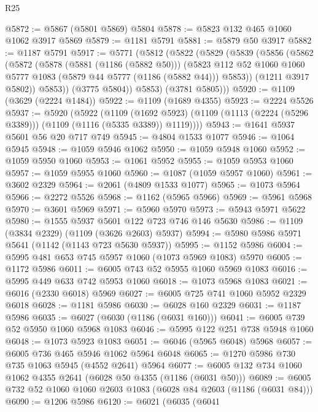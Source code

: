 \begin{lexlean}{R25}
\begin{coremodule}
@5872 := @5867 (@5801 @5869) @5804
@5878 := @5823 @132 @465 @1060 @1062 @3917 @5869
@5879 := @1181 @5791
@5881 := @5879 @50 @3917
@5882 := @1187 @5791
@5917 := @5771
    (@5812
      (@5822
        (@5829
          (@5839
            (@5856
              (@5862
                (@5872
                  (@5878
                    (@5881 (@1186 (@5882 @50)))
                    (@5823
                      @112
                      @52
                      @1060
                      @1060
                      @5777
                      @1083
                      (@5879 @44 @5777 (@1186 (@5882 @44)))
                      @5853))
                  (@1211 @3917 @5802))
                @5853))
            (@3775 @5804))
          @5853)
        (@3781 @5805)))
@5920 := @1109 (@3629 (@2224 @1484))
@5922 := @1109 (@1689 @4355)
@5923 := @2224 @5526
@5937 := @5920
    (@5922
      (@1109
        (@1692 @5923)
        (@1109 (@1113 (@2224 (@5296 @3389))) (@1109 (@1116 (@5335 @3389)) @1119))))
@5943 := @1641 @5937 @5601 @56 @20 @717 @749
@5945 := @4804 @1533 @1077
@5946 := @1064 @5945
@5948 := @1059 @5946 @1062
@5950 := @1059 @5948 @1060
@5952 := @1059 @5950 @1060
@5953 := @1061 @5952
@5955 := @1059 @5953 @1060
@5957 := @1059 @5955 @1060
@5960 := @1087 (@1059 @5957 @1060)
@5961 := @3602 @2329
@5964 := @2061 (@4809 @1533 @1077)
@5965 := @1073 @5964
@5966 := @2272 @5526
@5968 := @1162 (@5965 @5966)
@5969 := @5961 @5968
@5970 := @3601 @5969
@5971 := @5960 @5970
@5973 := @5943 @5971 @5622
@5980 := @1555 @5937 @5601 @122 @723 @746 @146 @5630
@5986 := @1109 (@3834 @2329) (@1109 (@3626 @2603) @5937)
@5994 := @5980 @5986 @5971 @5641 (@1142 (@1143 @723 @5630 @5937))
@5995 := @1152 @5986
@6004 := @5995 @481 @653 @745 @5957 @1060 (@1073 @5969 @1083) @5970
@6005 := @1172 @5986
@6011 := @6005 @743 @52 @5955 @1060 @5969 @1083
@6016 := @5995 @449 @633 @742 @5953 @1060
@6018 := @1073 @5968 @1083
@6021 := @6016 (@2330 @6018) @5969
@6027 := @6005 @725 @741 @1060 @5952 @2329 @6018
@6028 := @1181 @5986
@6030 := @6028 @160 @2329
@6031 := @1187 @5986
@6035 := @6027 (@6030 (@1186 (@6031 @160)))
@6041 := @6005 @739 @52 @5950 @1060 @5968 @1083
@6046 := @5995 @122 @251 @738 @5948 @1060
@6048 := @1073 @5923 @1083
@6051 := @6046 (@5965 @6048) @5968
@6057 := @6005 @736 @465 @5946 @1062 @5964 @6048
@6065 := @1270 @5986 @730 @735 @1063 @5945 (@4552 @2641) @5964
@6077 := @6005 @132 @734 @1060 @1062 @4355 @2641 (@6028 @50 @4355 (@1186 (@6031 @50)))
@6089 := @6005 @732 @52 @1060 @1060 @2603 @1083 (@6028 @84 @2603 (@1186 (@6031 @84)))
@6090 := @1206 @5986
@6120 := @6021
    (@6035
      (@6041

\end{coremodule}
\end{lexlean}

